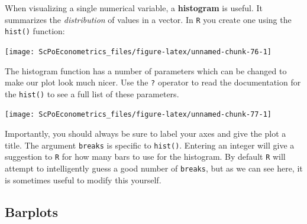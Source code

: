 \documentclass[]{book}
\newenvironment{Shaded}{\begin{snugshade}}{\end{snugshade}}
\newcommand{\KeywordTok}[1]{\textcolor[rgb]{0.13,0.29,0.53}{\textbf{#1}}}
\newcommand{\DataTypeTok}[1]{\textcolor[rgb]{0.13,0.29,0.53}{#1}}
\newcommand{\DecValTok}[1]{\textcolor[rgb]{0.00,0.00,0.81}{#1}}
\newcommand{\StringTok}[1]{\textcolor[rgb]{0.31,0.60,0.02}{#1}}
\newcommand{\CommentTok}[1]{\textcolor[rgb]{0.56,0.35,0.01}{\textit{#1}}}
\newcommand{\OperatorTok}[1]{\textcolor[rgb]{0.81,0.36,0.00}{\textbf{#1}}}
\newcommand{\NormalTok}[1]{#1}
\begin{document}
When visualizing a single numerical variable, a \textbf{histogram} is
useful. It summarizes the \emph{distribution} of values in a vector. In
\texttt{R} you create one using the \texttt{hist()} function:

\begin{Shaded}
\end{Shaded}

\begin{center}\texttt{[image: ScPoEconometrics\_files/figure-latex/unnamed-chunk-76-1]} \end{center}

The histogram function has a number of parameters which can be changed
to make our plot look much nicer. Use the \texttt{?} operator to read
the documentation for the \texttt{hist()} to see a full list of these
parameters.

\begin{Shaded}
\end{Shaded}

\begin{center}\texttt{[image: ScPoEconometrics\_files/figure-latex/unnamed-chunk-77-1]} \end{center}

Importantly, you should always be sure to label your axes and give the
plot a title. The argument \texttt{breaks} is specific to
\texttt{hist()}. Entering an integer will give a suggestion to
\texttt{R} for how many bars to use for the histogram. By default
\texttt{R} will attempt to intelligently guess a good number of
\texttt{breaks}, but as we can see here, it is sometimes useful to
modify this yourself.

\subsection{Barplots}\label{barplots}
\end{document}

